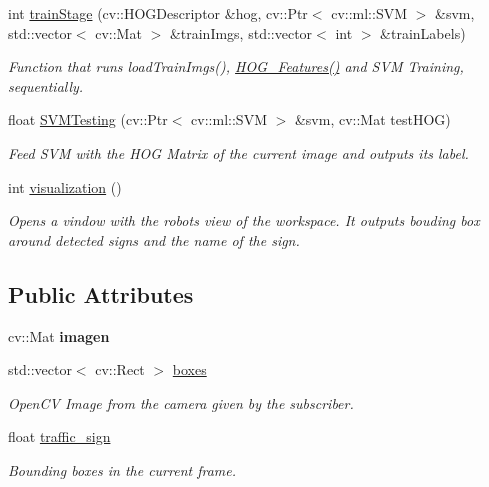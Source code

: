 \begin{DoxyCompactItemize}
int \hyperlink{classclassifier_af243db8f8ebd929c4cbe6ce9581b06c5}{train\+Stage} (cv\+::\+H\+O\+G\+Descriptor \&hog, cv\+::\+Ptr$<$ cv\+::ml\+::\+S\+VM $>$ \&svm, std\+::vector$<$ cv\+::\+Mat $>$ \&train\+Imgs, std\+::vector$<$ int $>$ \&train\+Labels)
\begin{DoxyCompactList}\small\item\em Function that runs load\+Train\+Imgs(), \hyperlink{classclassifier_a162fa849e75034ee7e86b1081de8f3c3}{H\+O\+G\+\_\+\+Features()} and S\+VM Training, sequentially. \end{DoxyCompactList}\item 
float \hyperlink{classclassifier_ac32914e9de8dc54ed6f803987bf24d25}{S\+V\+M\+Testing} (cv\+::\+Ptr$<$ cv\+::ml\+::\+S\+VM $>$ \&svm, cv\+::\+Mat test\+H\+OG)
\begin{DoxyCompactList}\small\item\em Feed S\+VM with the H\+OG Matrix of the current image and outputs its label. \end{DoxyCompactList}\item 
int \hyperlink{classclassifier_a6cc30b3645926233cbf880c8fa100536}{visualization} ()
\begin{DoxyCompactList}\small\item\em Opens a vindow with the robot\textquotesingle{}s view of the workspace. It outputs bouding box around detected signs and the name of the sign. \end{DoxyCompactList}\end{DoxyCompactItemize}
\subsection*{Public Attributes}
\begin{DoxyCompactItemize}
\item 
cv\+::\+Mat {\bfseries imagen}\hypertarget{classclassifier_a26cdea6917e91262aed520a607eff875}{}\label{classclassifier_a26cdea6917e91262aed520a607eff875}

\item 
std\+::vector$<$ cv\+::\+Rect $>$ \hyperlink{classclassifier_af8f673465c7e37684c3a28a90b8bdc00}{boxes}\hypertarget{classclassifier_af8f673465c7e37684c3a28a90b8bdc00}{}\label{classclassifier_af8f673465c7e37684c3a28a90b8bdc00}

\begin{DoxyCompactList}\small\item\em Open\+CV Image from the camera given by the subscriber. \end{DoxyCompactList}\item 
float \hyperlink{classclassifier_ac13295d3b350ef6c8219004666aeff18}{traffic\+\_\+sign}\hypertarget{classclassifier_ac13295d3b350ef6c8219004666aeff18}{}\label{classclassifier_ac13295d3b350ef6c8219004666aeff18}

\begin{DoxyCompactList}\small\item\em Bounding boxes in the current frame. \end{DoxyCompactList}\end{DoxyCompactItemize}


